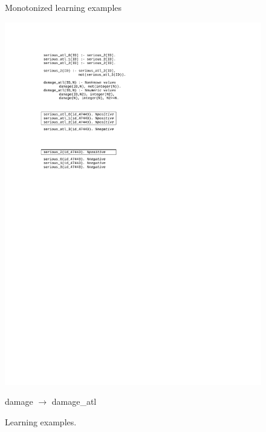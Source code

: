 \documentclass[authoryear,12pt]{elsarticle}
\begin{document}
\begin{figure}[ht]
\begin{minipage}[b]{0.5\hsize}
	Monotonized learning examples\\
	\centerline{\includegraphics[width=\hsize]{img/examples_monot}}
	\caption{Learning examples.}
	\label{img:examples}
\end{minipage}
\hspace{0.5cm}
\begin{minipage}[b]{0.5\hsize}
	damage $\rightarrow$ damage\_atl\\

\end{minipage}
\end{figure}
\end{document}
